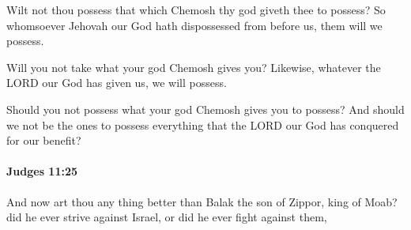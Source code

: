 			\begin{versebox}
					\item[BHS] 
					\item[ASV] Wilt not thou possess that which Chemosh thy god giveth thee to possess? So whomsoever Jehovah our God hath dispossessed from before us, them will we possess.
					\item[NIV] Will you not take what your god Chemosh gives you? Likewise, whatever the LORD our God has given us, we will possess.
					\item[NRSV] Should you not possess what your god Chemosh gives you to possess? And should we not be the ones to possess everything that the LORD our God has conquered for our benefit?
			\end{versebox}

		\paragraph{Judges 11:25} %
			\label{JUDGES-11-25}

			And now art thou any thing better than Balak the son of Zippor, king of Moab? did he ever strive against Israel, or did he ever fight against them,

